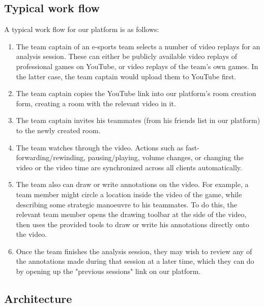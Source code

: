 \documentclass[conference]{IEEEtran}
\begin{document}
\subsection{Typical work flow}

  A typical work flow for our platform is as follows:

  \begin{enumerate}
      \item The team captain of an e-sports team selects a number of video replays for an analysis session. These can either be publicly available video replays of professional games on YouTube, or video replays of the team's own games. In the latter case, the team captain would upload them to YouTube first.

      \item The team captain copies the YouTube link into our platform's room creation form, creating a room with the relevant video in it.

      \item The team captain invites his teammates (from his friends list in our platform) to the newly created room.

      \item The team watches through the video. Actions such as fast-forwarding/rewinding, pausing/playing, volume changes, or changing the video or the video time are synchronized across all clients automatically.

      \item The team also can draw or write annotations on the video. For example, a team member might circle a location inside the video of the game, while describing some strategic manoeuvre to his teammates. To do this, the relevant team member opens the drawing toolbar at the side of the video, then uses the provided tools to draw or write his annotations directly onto the video.

      \item Once the team finishes the analysis session, they may wish to review any of the annotations made during that session at a later time, which they can do by opening up the "previous sessions" link on our platform.
  \end{enumerate}

\subsection{Architecture}

\end{document}
